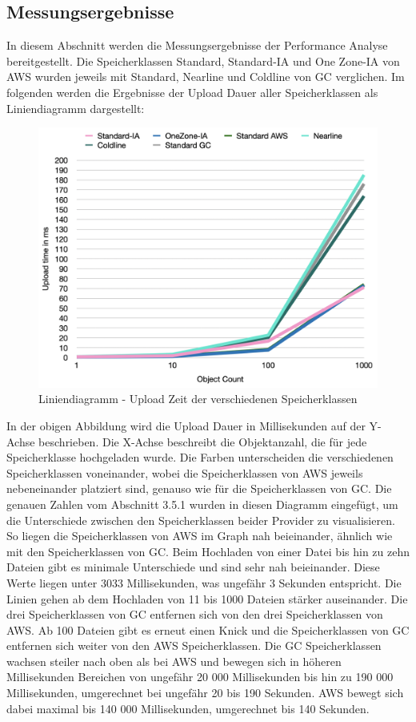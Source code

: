 \newpage
\subsection{Messungsergebnisse}

In diesem Abschnitt werden die Messungsergebnisse der Performance Analyse bereitgestellt. Die Speicherklassen Standard, Standard-IA und One Zone-IA von AWS wurden jeweils mit Standard, Nearline und Coldline von GC verglichen. Im folgenden werden die Ergebnisse der Upload Dauer aller Speicherklassen als Liniendiagramm dargestellt:

\begin{figure}[h]
	\centering
	\includegraphics[width=13cm,keepaspectratio]{Pictures/UploadTime.png}
	\caption{Liniendiagramm - Upload Zeit der verschiedenen Speicherklassen}
\end{figure}	

In der obigen Abbildung wird die Upload Dauer in Millisekunden auf der Y-Achse beschrieben. Die X-Achse beschreibt die Objektanzahl, die für jede Speicherklasse hochgeladen wurde. Die Farben unterscheiden die verschiedenen Speicherklassen voneinander, wobei die Speicherklassen von AWS jeweils nebeneinander platziert sind, genauso wie für die Speicherklassen von GC. Die genauen Zahlen vom Abschnitt 3.5.1 wurden in diesen Diagramm eingefügt, um die Unterschiede zwischen den Speicherklassen beider Provider zu visualisieren. So liegen die Speicherklassen von AWS im Graph nah beieinander, ähnlich wie mit den Speicherklassen von GC. Beim Hochladen von einer Datei bis hin zu zehn Dateien gibt es minimale Unterschiede und sind sehr nah beieinander. Diese Werte liegen unter 3033 Millisekunden, was ungefähr 3 Sekunden entspricht. Die Linien gehen ab dem Hochladen von 11 bis 1000 Dateien stärker auseinander. Die drei Speicherklassen von GC entfernen sich von den drei Speicherklassen von AWS. Ab 100 Dateien gibt es erneut einen Knick und die Speicherklassen von GC entfernen sich weiter von den AWS Speicherklassen. Die GC Speicherklassen wachsen steiler nach oben als bei AWS und bewegen sich in höheren Millisekunden Bereichen von ungefähr 20 000 Millisekunden bis hin zu 190 000 Millisekunden, umgerechnet bei ungefähr 20 bis 190 Sekunden. AWS bewegt sich dabei maximal bis 140 000 Millisekunden, umgerechnet bis 140 Sekunden. 

